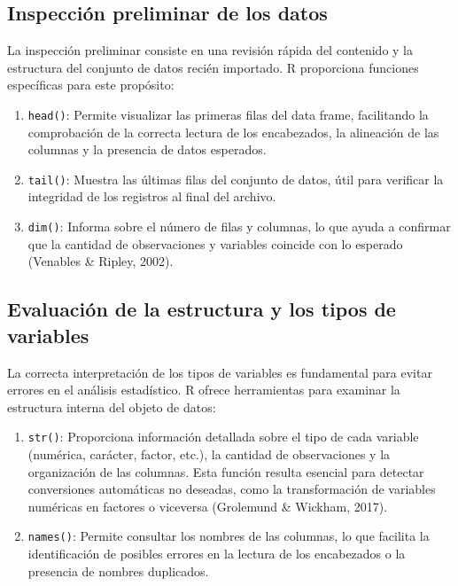 \documentclass[
  spanish,
  a4paper,
  DIV=11,
  numbers=noendperiod,
  onepage,
  openany]{scrreprt}
\begin{document}
\subsection{Inspección preliminar de los
datos}\label{inspecciuxf3n-preliminar-de-los-datos}

La inspección preliminar consiste en una revisión rápida del contenido y
la estructura del conjunto de datos recién importado. R proporciona
funciones específicas para este propósito:

\begin{enumerate}
\def\labelenumi{\arabic{enumi}.}
\item
  \texttt{head()}: Permite visualizar las primeras filas del data frame,
  facilitando la comprobación de la correcta lectura de los encabezados,
  la alineación de las columnas y la presencia de datos esperados.
\item
  \texttt{tail()}: Muestra las últimas filas del conjunto de datos, útil
  para verificar la integridad de los registros al final del archivo.
\item
  \texttt{dim()}: Informa sobre el número de filas y columnas, lo que
  ayuda a confirmar que la cantidad de observaciones y variables
  coincide con lo esperado (Venables \& Ripley, 2002).
\end{enumerate}

\subsection{Evaluación de la estructura y los tipos de
variables}\label{evaluaciuxf3n-de-la-estructura-y-los-tipos-de-variables}

La correcta interpretación de los tipos de variables es fundamental para
evitar errores en el análisis estadístico. R ofrece herramientas para
examinar la estructura interna del objeto de datos:

\begin{enumerate}
\def\labelenumi{\arabic{enumi}.}
\item
  \texttt{str()}: Proporciona información detallada sobre el tipo de
  cada variable (numérica, carácter, factor, etc.), la cantidad de
  observaciones y la organización de las columnas. Esta función resulta
  esencial para detectar conversiones automáticas no deseadas, como la
  transformación de variables numéricas en factores o viceversa
  (Grolemund \& Wickham, 2017).
\item
  \texttt{names()}: Permite consultar los nombres de las columnas, lo
  que facilita la identificación de posibles errores en la lectura de
  los encabezados o la presencia de nombres duplicados.
\end{enumerate}
\end{document}
